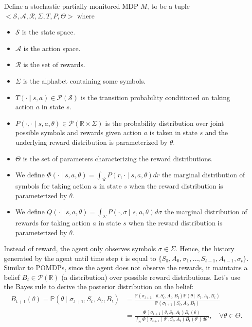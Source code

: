 \documentclass[a4paper]{article}
\theoremstyle{definition}
\newcommand{\cA}{\mathcal{A}}
\newcommand{\cS}{\mathcal{S}}
\newcommand{\cR}{\mathcal{R}}
\newcommand{\cP}{\mathcal{P}}
\newcommand{\R}{\mathbb{R}}
\renewcommand{\P}{\mathbb{P}}
\begin{document}
Define a stochastic partially monitored MDP $M$, to be a tuple $<\cS, \cA, \cR, \Sigma, T, P, \Theta>$ where
\begin{itemize}
    \item $\cS$ is the state space.
    \item $\cA$ is the action space.
    \item $\cR$ is the set of rewards.
    \item $\Sigma$ is the alphabet containing some symbols.
    \item $T(\cdot \mid s, a) \in \cP(\cS)$ is the transition probability conditioned on taking action $a$ in state $s$.
    \item $P(\cdot, \cdot \mid s, a, \theta) \in \cP(\R \times\Sigma)$ is the probability distribution over joint possible symbols and rewards given action $a$ is taken in state $s$ and the underlying reward distribution is parameterized by $\theta$.
    \item $\Theta$ is the set of parameters characterizing the reward distributions.
    \item We define $\Phi(\cdot \mid s, a, \theta) = \int_{\cR}P(r, \cdot \mid s, a , \theta)dr$ the marginal distribution of symbols for taking action $a$ in state $s$ when the reward distribution is parameterized by $\theta$.
    \item We define $Q(\cdot \mid s, a, \theta) = \int_{\Sigma}P(\cdot, \sigma \mid s, a , \theta)d\sigma$ the marginal distribution of rewards for taking action $a$ in state $s$ when the reward distribution is parameterized by $\theta$.
\end{itemize}
Instead of reward, the agent only observes symbols $\sigma \in \Sigma$. Hence, the history generated by the agent until time step $t$ is equal to $\{S_0, A_0, \sigma_1, \dots, S_{t - 1}, A_{t - 1}, \sigma_t \}$. Similar to POMDPs, since the agent does not observe the rewards, it maintains a belief $B_t \in \cP(\R)$ (a distribution) over possible reward distributions. Let's use the Bayes rule to derive the posterior distribution on the belief:
\begin{align}
B_{t + 1}\left(\theta \right) = \P(\theta \mid \sigma_{t + 1}, S_t, A_t, B_t) & = \frac{\P(\sigma_{t + 1} \mid \theta, S_t, A_t, B_t)\P(\theta \mid S_t, A_t, B_t)}{\P(\sigma_{t + 1} \mid S_t, A_t, B_t)} \nonumber \\
     &= \frac{\Phi(\sigma_{t + 1} \mid \theta, S_t, A_t)B_t(\theta)}{\int_{\Theta}\Phi(\sigma_{t + 1} \mid \theta', S_t, A_t) B_t(\theta') d\theta'}, \quad \forall \theta \in \Theta. \nonumber
\end{align}
%
\end{document}
